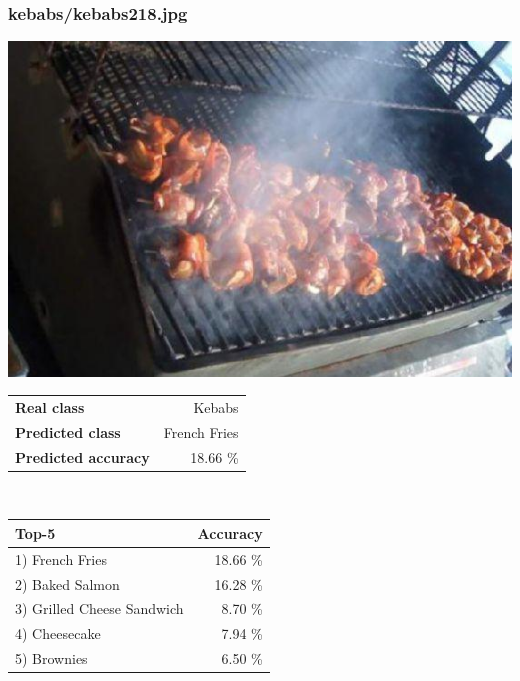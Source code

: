 \subsubsection{kebabs/kebabs218.jpg}

\begin{minipage}[t]{0.4\textwidth}
	\vspace{0pt}
	\includegraphics[width=\linewidth]{images/evaluation-images/kebabs/kebabs218.jpg}
\end{minipage}
\hfill
\begin{minipage}[t]{0.5\textwidth}
	\vspace{0pt}\raggedright
	\begin{tabularx}{\textwidth}{X r}
		\small \textbf{Real class} & \small Kebabs\\
		\small \textbf{Predicted class} & \small French Fries\\
		\small \textbf{Predicted accuracy} & \small 18.66 \%
    \end{tabularx}\\
    
    \vspace{6pt}
	\begin{tabularx}{\textwidth}{X r}
        \small \textbf{Top-5} & \small \textbf{Accuracy} \\
        \hline
		\small 1) French Fries & \small 18.66 \%\\\small 2) Baked Salmon & \small 16.28 \%\\\small 3) Grilled Cheese Sandwich & \small 8.70 \%\\\small 4) Cheesecake & \small 7.94 \%\\\small 5) Brownies & \small 6.50 \%
    \end{tabularx}
\end{minipage}
    
